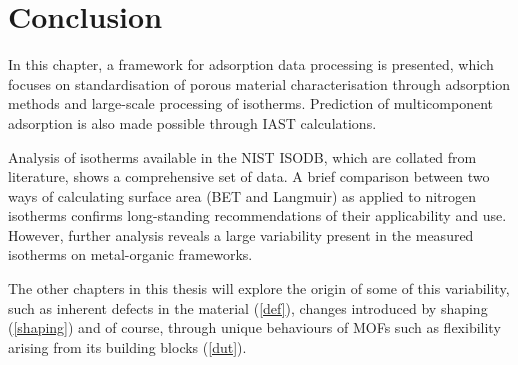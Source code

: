 
\section{Conclusion}

In this chapter, a framework for adsorption data processing is 
presented, which focuses on standardisation of porous material 
characterisation through adsorption methods and large-scale 
processing of isotherms. Prediction of multicomponent 
adsorption is also made possible through IAST calculations.

Analysis of isotherms available in the NIST ISODB, which are collated
from literature, shows a comprehensive set of data. A brief comparison
between two ways of calculating surface area (BET and Langmuir) as applied to nitrogen isotherms confirms long-standing recommendations of their
applicability and use. However, further analysis reveals a large 
variability present in the measured isotherms on metal-organic 
frameworks.

The other chapters in this thesis will explore the origin of some of
this variability, such as inherent defects in the material (\autoref{def}),
changes introduced by shaping (\autoref{shaping}) and of course, through
unique behaviours of MOFs such as flexibility arising from its building
blocks (\autoref{dut}).

\FloatBarrier%
\pagebreak